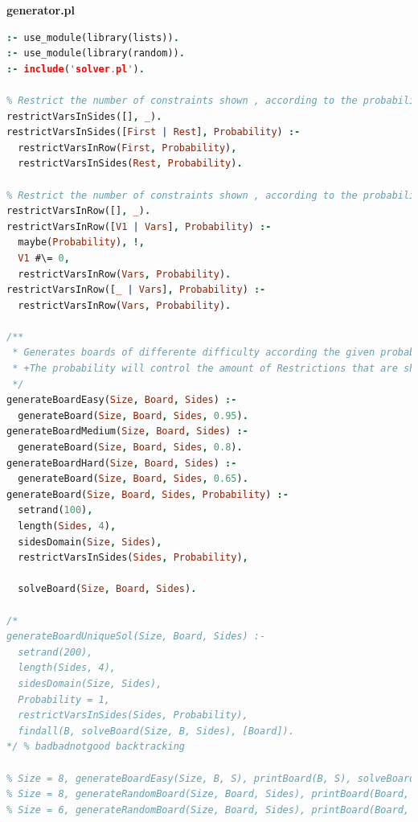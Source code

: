 \documentclass{llncs}
\begin{document}
\huge\textbf{generator.pl}
\begin{lstlisting}[language=Prolog]
:- use_module(library(lists)).
:- use_module(library(random)).
:- include('solver.pl').

% Restrict the number of constraints shown , according to the probability
restrictVarsInSides([], _).
restrictVarsInSides([First | Rest], Probability) :-
  restrictVarsInRow(First, Probability),
  restrictVarsInSides(Rest, Probability).

% Restrict the number of constraints shown , according to the probability
restrictVarsInRow([], _).
restrictVarsInRow([V1 | Vars], Probability) :-
  maybe(Probability), !,
  V1 #\= 0,
  restrictVarsInRow(Vars, Probability).
restrictVarsInRow([_ | Vars], Probability) :-
  restrictVarsInRow(Vars, Probability).

/**
 * Generates boards of differente difficulty according the given probability.
 * +The probability will control the amount of Restrictions that are shown.
 */
generateBoardEasy(Size, Board, Sides) :-
  generateBoard(Size, Board, Sides, 0.95).
generateBoardMedium(Size, Board, Sides) :-
  generateBoard(Size, Board, Sides, 0.8).
generateBoardHard(Size, Board, Sides) :-
  generateBoard(Size, Board, Sides, 0.65).
generateBoard(Size, Board, Sides, Probability) :-
  setrand(100),
  length(Sides, 4),
  sidesDomain(Size, Sides),
  restrictVarsInSides(Sides, Probability),

  solveBoard(Size, Board, Sides).

/*
generateBoardUniqueSol(Size, Board, Sides) :-
  setrand(200),
  length(Sides, 4),
  sidesDomain(Size, Sides),
  Probability = 1,
  restrictVarsInSides(Sides, Probability),
  findall(B, solveBoard(Size, B, Sides), [Board]).
*/ % badbadnotgood backtracking

% Size = 8, generateBoardEasy(Size, B, S), printBoard(B, S), solveBoard(Size, SB, S), printBoard(SB, S).
% Size = 8, generateRandomBoard(Size, Board, Sides), printBoard(Board, Sides), solveBoard(Size, SameBoard, Sides), printBoard(SameBoard, Sides), Board = SameBoard.
% Size = 6, generateRandomBoard(Size, Board, Sides), printBoard(Board, Sides), solveBoard(Size, SameBoard, Sides), Board = SameBoard.

\end{lstlisting}
\newpage
\end{document}

